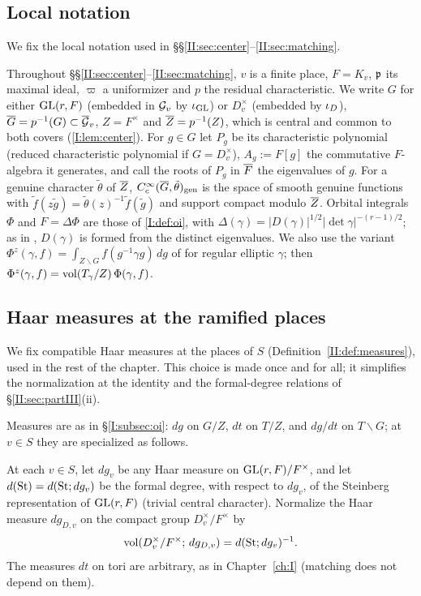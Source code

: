 \subsection{Local notation}\label{II:subsec:localnotation}
We fix the local notation used in \S\S\ref{II:sec:center}--\ref{II:sec:matching}.

Throughout \S\S\ref{II:sec:center}--\ref{II:sec:matching}, $v$ is a finite place, $F=K_v$, $\mathfrak{p}$ its maximal ideal, $\varpi$ a uniformizer and $p$ the residual characteristic. We write $G$ for either $\mathrm{GL}(r,F)$ (embedded in $\mathcal{G}_v$ by $\iota_{\mathrm{GL}}$) or $D_v^\times$ (embedded by $\iota_D$), $\overline{G}=p^{-1}(G)\subset\overline{\mathcal{G}}_v$, $Z=F^\times$ and $\overline{Z}=p^{-1}(Z)$, which is central and common to both covers (\cref{I:lem:center}). For $g\in G$ let $P_g$ be its characteristic polynomial (reduced characteristic polynomial if $G=D_v^\times$), $A_g:=F[g]$ the commutative $F$-algebra it generates, and call the roots of $P_g$ in $\overline{F}$ the eigenvalues of $g$. For a genuine character $\tilde\theta$ of $\overline{Z}$, $C_c^\infty(\overline{G},\tilde\theta)_{\mathrm{gen}}$ is the space of smooth genuine functions with $\tilde f(z\tilde g)=\tilde\theta(z)^{-1}\tilde f(\tilde g)$ and support compact modulo $\overline{Z}$. Orbital integrals $\Phi$ and $F=\Delta\Phi$ are those of \cref{I:def:oi}, with $\Delta(\gamma)=|D(\gamma)|^{1/2}|\det\gamma|^{-(r-1)/2}$; as in \cite[\S6]{FK86}, $D(\gamma)$ is formed from the distinct eigenvalues. We also use the variant $\Phi^z(\gamma,f)=\int_{Z\backslash G}f(g^{-1}\gamma g)\,dg$ of \cite[\S6]{FK86} for regular elliptic $\gamma$; then $\Phi^z(\gamma,f)=\operatorname{vol}(T_\gamma/Z)\,\Phi(\gamma,f)$.

\subsection{Haar measures at the ramified places}\label{II:subsec:measures}
We fix compatible Haar measures at the places of $S$ (Definition~\ref{II:def:measures}), used in the rest of the chapter. This choice is made once and for all; it simplifies the normalization at the identity and the formal-degree relations of \S\ref{II:sec:partIII}(ii).

Measures are as in \S\ref{I:subsec:oi}: $dg$ on $G/Z$, $dt$ on $T/Z$, and $dg/dt$ on $T\backslash G$; at $v\in S$ they are specialized as follows.

\begin{definition}\label{II:def:measures}
At each $v\in S$, let $dg_v$ be any Haar measure on $\mathrm{GL}(r,F)/F^\times$, and let $d(\mathrm{St})=d(\mathrm{St};dg_v)$ be the formal degree, with respect to $dg_v$, of the Steinberg representation of $\mathrm{GL}(r,F)$ (trivial central character). Normalize the Haar measure $dg_{D,v}$ on the compact group $D_v^\times/F^\times$ by
\[ \operatorname{vol}(D_v^\times/F^\times;\,dg_{D,v})=d(\mathrm{St};dg_v)^{-1}. \]
The measures $dt$ on tori are arbitrary, as in Chapter~\ref{ch:I} (matching does not depend on them).
\end{definition}

